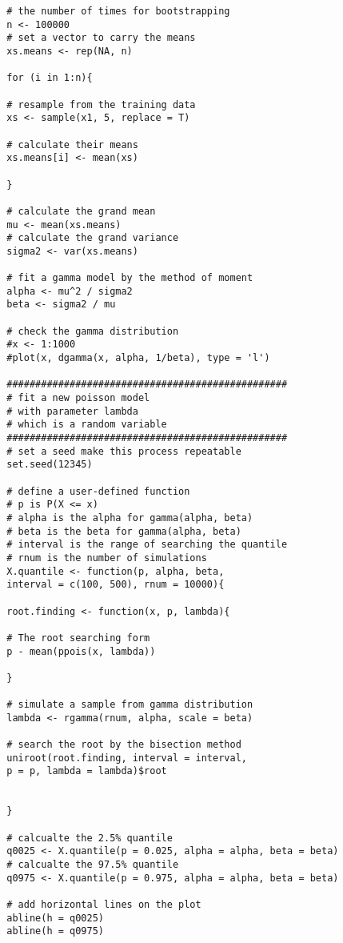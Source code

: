 \begin{enumerate}
\begin{verbatim}
		# the number of times for bootstrapping
		n <- 100000
		# set a vector to carry the means
		xs.means <- rep(NA, n)
		
		for (i in 1:n){
		
		# resample from the training data
		xs <- sample(x1, 5, replace = T)
		
		# calculate their means
		xs.means[i] <- mean(xs)
		
		}
		
		# calculate the grand mean
		mu <- mean(xs.means)
		# calculate the grand variance
		sigma2 <- var(xs.means)
		
		# fit a gamma model by the method of moment
		alpha <- mu^2 / sigma2
		beta <- sigma2 / mu
		
		# check the gamma distribution
		#x <- 1:1000 
		#plot(x, dgamma(x, alpha, 1/beta), type = 'l')
		
		#################################################
		# fit a new poisson model 
		# with parameter lambda 
		# which is a random variable
		#################################################
		# set a seed make this process repeatable
		set.seed(12345)
		
		# define a user-defined function
		# p is P(X <= x)
		# alpha is the alpha for gamma(alpha, beta)
		# beta is the beta for gamma(alpha, beta)
		# interval is the range of searching the quantile
		# rnum is the number of simulations
		X.quantile <- function(p, alpha, beta, 
		interval = c(100, 500), rnum = 10000){
		
		root.finding <- function(x, p, lambda){
		
		# The root searching form
		p - mean(ppois(x, lambda))
		
		}
		
		# simulate a sample from gamma distribution
		lambda <- rgamma(rnum, alpha, scale = beta)
		
		# search the root by the bisection method
		uniroot(root.finding, interval = interval, 
		p = p, lambda = lambda)$root
		
		
		}
		
		# calcualte the 2.5% quantile
		q0025 <- X.quantile(p = 0.025, alpha = alpha, beta = beta)
		# calcualte the 97.5% quantile
		q0975 <- X.quantile(p = 0.975, alpha = alpha, beta = beta)
		
		# add horizontal lines on the plot
		abline(h = q0025)
		abline(h = q0975)
	\end{verbatim}
\end{enumerate}